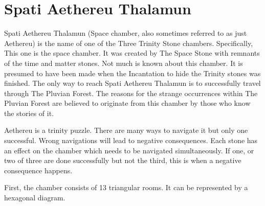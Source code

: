 \section{Spati Aethereu Thalamun}

Spati Aethereu Thalamun (Space chamber, also sometimes referred to as just Aethereu) is the name of one of the Three Trinity Stone chambers. Specifically, This one is the space chamber. It was created by The Space Stone with remnants of the time and matter stones. Not much is known about this chamber. It is presumed to have been made when the Incantation to hide the Trinity stones was finished. The only way to reach Spati Aethereu Thalamun is to successfully travel through The Pluvian Forest. The reasons for the strange occurrences within The Pluvian Forest are believed to originate from this chamber by those who know the stories of it.

Aethereu is a trinity puzzle. There are many ways to navigate it but only one successful. Wrong navigations will lead to negative consequences. Each stone has an effect on the chamber which needs to be navigated simultaneously. If one, or two of three are done successfully but not the third, this is when a negative consequence happens.

First, the chamber consists of 13 triangular rooms. It can be represented by a hexagonal diagram.